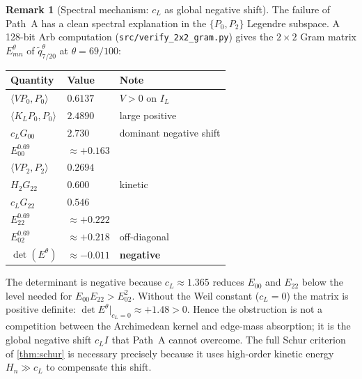 \documentclass[12pt,a4paper]{amsart}
\theoremstyle{plain}
\theoremstyle{definition}
\newtheorem{remark}[theorem]{Remark}
\begin{document}
\begin{remark}[Spectral mechanism: $c_L$ as global negative shift]
\label{rem:path-a-mechanism}
The failure of Path~A has a clean spectral explanation in the $\{P_0, P_2\}$
Legendre subspace.  A 128-bit Arb computation
(\texttt{src/verify\_2x2\_gram.py}) gives the $2\times2$ Gram matrix
$E^\theta_{mn}$ of $\tilde{q}_{7/20}^\theta$ at $\theta = 69/100$:
\begin{center}
\begin{tabular}{lll}
\toprule
Quantity & Value & Note \\
\midrule
$\langle VP_0,P_0\rangle$ & $0.6137$ & $V > 0$ on $I_L$ \\
$\langle K_LP_0,P_0\rangle$ & $2.4890$ & large positive \\
$c_L G_{00}$ & $2.730$ & dominant negative shift \\
$E_{00}^{0.69}$ & $\approx +0.163$ & \\
\midrule
$\langle VP_2,P_2\rangle$ & $0.2694$ & \\
$H_2 G_{22}$ & $0.600$ & kinetic \\
$c_L G_{22}$ & $0.546$ & \\
$E_{22}^{0.69}$ & $\approx +0.222$ & \\
\midrule
$E_{02}^{0.69}$ & $\approx +0.218$ & off-diagonal \\
$\det(E^\theta)$ & $\approx -0.011$ & \textbf{negative} \\
\bottomrule
\end{tabular}
\end{center}
The determinant is negative because $c_L \approx 1.365$ reduces $E_{00}$ and
$E_{22}$ below the level needed for $E_{00}E_{22} > E_{02}^2$.
Without the Weil constant ($c_L = 0$) the matrix is positive definite:
$\det E^\theta|_{c_L=0} \approx +1.48 > 0$.
Hence the obstruction is not a competition between the Archimedean kernel and
edge-mass absorption; it is the global negative shift $c_L I$ that Path~A
cannot overcome.  The full Schur criterion of \cref{thm:schur} is necessary
precisely because it uses high-order kinetic energy $H_n \gg c_L$ to
compensate this shift.
\end{remark}
\end{document}
